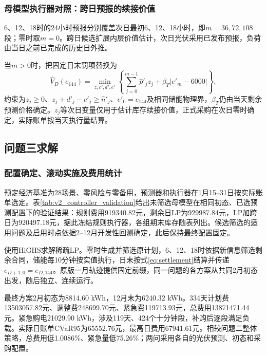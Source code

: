 \subsubsection{母模型执行器对照：跨日预报的续接价值}

6、12、18时的24小时预报分别覆盖次日最初6、12、18小时，即$m=36,72,108$段；零时取$m=0$。跨日候选扩展内层价值估计，次日光伏采用已发布预报，负荷由当日之前已完成的历史日外推。

当$m>0$时，把固定日末罚项替换为
\begin{equation}
 \widehat V_D(e_{144})=\min_{z,c',d',e'}
 \left\{\sum_{j=0}^{m-1}\widehat p'_jz_j+\beta_T|e'_m-6000|\right\},
 \label{eq:v2_continuation}
\end{equation}
约束为$z_j\ge0$、$z_j+d'_j-c'_j\ge\widehat n'_j$、$e'_0=e_{144}$及相同储能物理界，$\beta_T$仍由当天剩余预测价格确定。$z_j$等次日变量仅用于估计库存续接价值，正式采购在次日零时确定，实际账单按当天执行量结算。

\subsection{问题三求解}

\subsubsection{配置确定、滚动实施及费用统计}

预定经济基准为28场景、零风险与零备用，预测器和执行器在1月15--31日按实际账单选定。表\ref{tab:v2_controller_validation}给出未筛选母模型在相同初态、已选预测配置下的验证结果：规则费用919340.82元，剩余日LP为929987.84元，LP加跨日为920497.18元，据此冻结规则执行器，各组期末库存随表列出。候选筛选的适用问题及启用时点依据2--12月开发性回测确定，此后保持最终配置固定。



使用HiGHS求解稀疏LP。零时生成并筛选原计划，6、12、18时依据新信息筛选剩余合同，储能每10分钟按实值执行，日末按式\eqref{eq:settlement}结算并传递$e_{D+1,0}=e_{D,144}$。原版一月轨迹提供固定前缀，同一问题的各方案从共同2月初态出发，随后独立、连续运行。

最终方案2月初态为8814.60 kWh，12月末为6240.32 kWh。334天计划费13503057.82元、调整费248699.70元、紧急费119713.93元，总费用13871471.44元。紧急购电21029.90 kWh，涉及119天、424个十分钟段，补购后逐段满足负载。实际日账单CVaR95为65552.76元，最高日费用67941.61元。相较问题二整体策略，总费用低1.0086\%、紧急量低75.26\%；两问采用各自的光伏预测、初态和采购配置。

